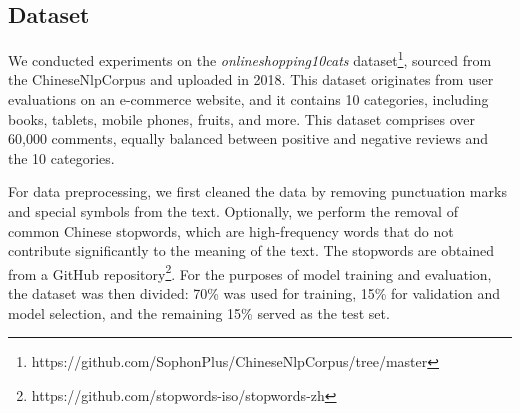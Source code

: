 \subsection{Dataset}
We conducted experiments on the \textit{onlineshopping10cats} dataset\footnote{https://github.com/SophonPlus/ChineseNlpCorpus/tree/master}, sourced from the ChineseNlpCorpus and uploaded in 2018. This dataset originates from user evaluations on an e-commerce website, and it contains 10 categories, including books, tablets, mobile phones, fruits, and more. This dataset comprises over 60,000 comments, equally balanced between positive and negative reviews and the 10 categories.

For data preprocessing, we first cleaned the data by removing punctuation marks and special symbols from the text. Optionally, we perform the removal of common Chinese stopwords, which are high-frequency words that do not contribute significantly to the meaning of the text. The stopwords are obtained from a GitHub repository\footnote{https://github.com/stopwords-iso/stopwords-zh}. For the purposes of model training and evaluation, the dataset was then divided: 70\% was used for training, 15\% for validation and model selection, and the remaining 15\% served as the test set. 



